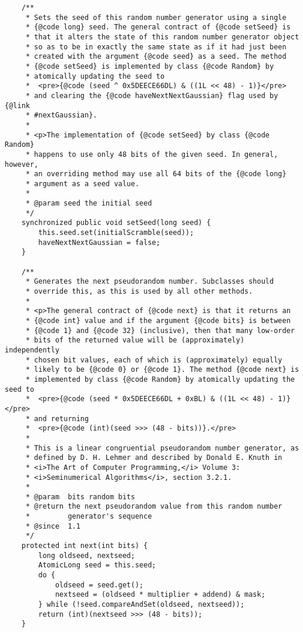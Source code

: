 \documentclass[12pt,a4paper,twoside,openright,titlepage,final]{article}
\begin{document}
\begin{verbatim}
    /**
     * Sets the seed of this random number generator using a single
     * {@code long} seed. The general contract of {@code setSeed} is
     * that it alters the state of this random number generator object
     * so as to be in exactly the same state as if it had just been
     * created with the argument {@code seed} as a seed. The method
     * {@code setSeed} is implemented by class {@code Random} by
     * atomically updating the seed to
     *  <pre>{@code (seed ^ 0x5DEECE66DL) & ((1L << 48) - 1)}</pre>
     * and clearing the {@code haveNextNextGaussian} flag used by {@link
     * #nextGaussian}.
     *
     * <p>The implementation of {@code setSeed} by class {@code Random}
     * happens to use only 48 bits of the given seed. In general, however,
     * an overriding method may use all 64 bits of the {@code long}
     * argument as a seed value.
     *
     * @param seed the initial seed
     */
    synchronized public void setSeed(long seed) {
        this.seed.set(initialScramble(seed));
        haveNextNextGaussian = false;
    }

    /**
     * Generates the next pseudorandom number. Subclasses should
     * override this, as this is used by all other methods.
     *
     * <p>The general contract of {@code next} is that it returns an
     * {@code int} value and if the argument {@code bits} is between
     * {@code 1} and {@code 32} (inclusive), then that many low-order
     * bits of the returned value will be (approximately) independently
     * chosen bit values, each of which is (approximately) equally
     * likely to be {@code 0} or {@code 1}. The method {@code next} is
     * implemented by class {@code Random} by atomically updating the seed to
     *  <pre>{@code (seed * 0x5DEECE66DL + 0xBL) & ((1L << 48) - 1)}</pre>
     * and returning
     *  <pre>{@code (int)(seed >>> (48 - bits))}.</pre>
     *
     * This is a linear congruential pseudorandom number generator, as
     * defined by D. H. Lehmer and described by Donald E. Knuth in
     * <i>The Art of Computer Programming,</i> Volume 3:
     * <i>Seminumerical Algorithms</i>, section 3.2.1.
     *
     * @param  bits random bits
     * @return the next pseudorandom value from this random number
     *         generator's sequence
     * @since  1.1
     */
    protected int next(int bits) {
        long oldseed, nextseed;
        AtomicLong seed = this.seed;
        do {
            oldseed = seed.get();
            nextseed = (oldseed * multiplier + addend) & mask;
        } while (!seed.compareAndSet(oldseed, nextseed));
        return (int)(nextseed >>> (48 - bits));
    }


\end{verbatim}
\end{document}
